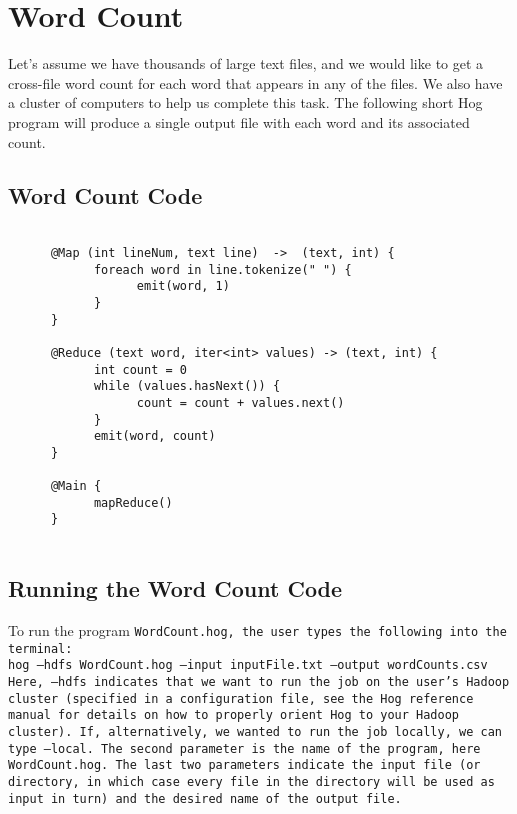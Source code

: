 \documentclass{article} \usepackage{fancyhdr, multicol}
\begin{document}
\section*{Word Count} 
\label{word_count} 

Let's assume we have thousands of large text files, and we would like to get a
cross-file word count for each word that appears in any of the files. We also have
a cluster of computers to help us complete this task. The following short Hog
program will produce a single output file with each word and its associated count.

\subsection*{Word Count Code}
\begin{verbatim}
      
      @Map (int lineNum, text line)  ->  (text, int) {
            foreach word in line.tokenize(" ") {
                  emit(word, 1)
            }
      }
      
      @Reduce (text word, iter<int> values) -> (text, int) {
            int count = 0
            while (values.hasNext()) {
                  count = count + values.next()
            }
            emit(word, count)
      }
      
      @Main {
            mapReduce()
      }
      
\end{verbatim}

\subsection*{Running the Word Count Code} %
\label{sub:running_the_word_count_code}

To run the program \tt WordCount.hog\rm, the user types the following into the
terminal: \\

\noindent \tt hog --hdfs WordCount.hog --input inputFile.txt
--output wordCounts.csv \rm \\

Here, \tt --hdfs \rm indicates that we want to run the job on the user's Hadoop
cluster (specified in a configuration file, see the Hog reference manual for
details on how to properly orient Hog to your Hadoop cluster). If, alternatively,
we wanted to run the job locally, we can type \tt --local\rm. The second parameter
is the name of the program, here \tt WordCount.hog\rm. The last two parameters
indicate the input file (or directory, in which case every file in the directory
will be used as input in turn) and the desired name of the output file.
\end{document}
